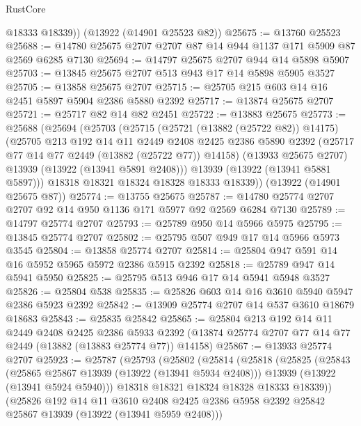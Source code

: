 \begin{lexlean}{RustCore}
\begin{coremodule}
        @18333
        @18339))
    (@13922 (@14901 @25523 @82))
@25675 := @13760 @25523
@25688 := @14780 @25675 @2707 @2707 @87 @14 @944 @1137 @171 @5909 @87 @2569 @6285 @7130
@25694 := @14797 @25675 @2707 @944 @14 @5898 @5907
@25703 := @13845 @25675 @2707 @513 @943 @17 @14 @5898 @5905 @3527
@25705 := @13858 @25675 @2707
@25715 := @25705 @215 @603 @14 @16 @2451 @5897 @5904 @2386 @5880 @2392
@25717 := @13874 @25675 @2707
@25721 := @25717 @82 @14 @82 @2451
@25722 := @13883 @25675
@25773 := @25688
    (@25694
      (@25703
        (@25715
          (@25721 (@13882 (@25722 @82)) @14175)
          (@25705
            @213
            @192
            @14
            @11
            @2449
            @2408
            @2425
            @2386
            @5890
            @2392
            (@25717 @77 @14 @77 @2449 (@13882 (@25722 @77)) @14158)
            (@13933 @25675 @2707)
            @13939
            (@13922 (@13941 @5891 @2408)))
          @13939
          (@13922 (@13941 @5881 @5897)))
        @18318
        @18321
        @18324
        @18328
        @18333
        @18339))
    (@13922 (@14901 @25675 @87))
@25774 := @13755 @25675
@25787 := @14780 @25774 @2707 @2707 @92 @14 @950 @1136 @171 @5977 @92 @2569 @6284 @7130
@25789 := @14797 @25774 @2707
@25793 := @25789 @950 @14 @5966 @5975
@25795 := @13845 @25774 @2707
@25802 := @25795 @507 @949 @17 @14 @5966 @5973 @3545
@25804 := @13858 @25774 @2707
@25814 := @25804 @947 @591 @14 @16 @5952 @5965 @5972 @2386 @5915 @2392
@25818 := @25789 @947 @14 @5941 @5950
@25825 := @25795 @513 @946 @17 @14 @5941 @5948 @3527
@25826 := @25804 @538
@25835 := @25826 @603 @14 @16 @3610 @5940 @5947 @2386 @5923 @2392
@25842 := @13909 @25774 @2707 @14 @537 @3610 @18679 @18683
@25843 := @25835 @25842
@25865 := @25804
    @213
    @192
    @14
    @11
    @2449
    @2408
    @2425
    @2386
    @5933
    @2392
    (@13874 @25774 @2707 @77 @14 @77 @2449 (@13882 (@13883 @25774 @77)) @14158)
@25867 := @13933 @25774 @2707
@25923 := @25787
    (@25793
      (@25802
        (@25814
          (@25818
            (@25825
              (@25843
                (@25865 @25867 @13939 (@13922 (@13941 @5934 @2408)))
                @13939
                (@13922 (@13941 @5924 @5940)))
              @18318
              @18321
              @18324
              @18328
              @18333
              @18339))
          (@25826
            @192
            @14
            @11
            @3610
            @2408
            @2425
            @2386
            @5958
            @2392
            @25842
            @25867
            @13939
            (@13922 (@13941 @5959 @2408)))

\end{coremodule}
\end{lexlean}
